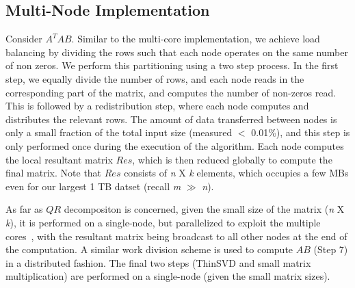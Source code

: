 \iffalse
\begin{itemize}
\item Cache-Friendly 
\item SIMD
\item Thread- or core-level
\item Multi-socket 
\end{itemize}
\fi

\subsection {Multi-Node Implementation}
Consider $A^TAB$.
Similar to the multi-core implementation, we achieve load balancing by
dividing the rows %
such that each node operates on the same number of non zeros. 
We perform this partitioning using a two step
process. In the first step, we equally divide the number of rows, 
and each node reads in the corresponding
part of the matrix, and computes the number of non-zeros read. This is
followed by a redistribution step, where each node computes 
and distributes the relevant rows.
The amount of data transferred between nodes is only a small fraction of the total input size
(measured $<$ 0.01\%), and this step is only performed once during the execution of
the algorithm.
Each node computes the local resultant matrix $Res$, which is then
reduced globally to compute the final matrix. Note that $Res$ consists
of {\it{n}} X {\it{k}} elements, which occupies a few MBs even
for our largest 1 TB datset  (recall {\it{m}} $\gg$ {\it{n}}). 

As far as $QR$ decompositon is concerned, given the small size of the
matrix ({\it{n}} X {\it{k}}), it is performed on a
single-node, but parallelized to exploit the multiple cores~\cite{to_cite}, with the resultant matrix being broadcast
to all other nodes at the end of the computation.
A similar work division scheme is used to compute $AB$ (Step 7) in a
distributed fashion. The final two steps (ThinSVD and small matrix
multiplication) are performed on a single-node (given the small matrix
sizes).




